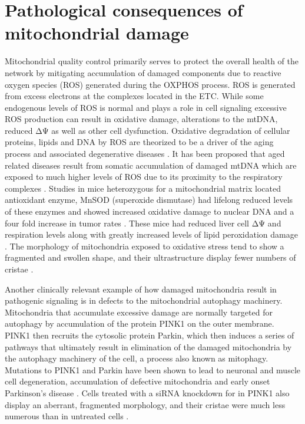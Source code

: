 \section{Pathological consequences of mitochondrial damage}
Mitochondrial quality control primarily serves to protect the overall health of the network by mitigating accumulation of damaged components due to reactive oxygen species (ROS) generated during the OXPHOS process. ROS is generated from excess electrons at the complexes located in the ETC. While some endogenous levels of ROS is normal and plays a role in cell signaling \cite{balaban_mitochondria_2005} excessive ROS production can result in oxidative damage, alterations to the mtDNA, reduced ΔΨ as well as other cell dysfunction. Oxidative degradation of cellular proteins, lipids and DNA by ROS are theorized to be a driver of the aging process \cite{harman_aging:_1956} and associated degenerative diseases \cite{nunnari_mitochondria:_2012}. It has been proposed that aged related diseases result from somatic accumulation of damaged mtDNA which are exposed to much higher levels of ROS due to its proximity to the respiratory complexes \cite{wallace_mitochondrial_2005}. Studies in mice heterozygous for a mitochondrial matrix located antioxidant enzyme, MnSOD (superoxide dismutase) had lifelong reduced levels of these enzymes and showed increased oxidative damage to nuclear DNA and a four fold increase in tumor rates \cite{remmen_life-long_2003}. These mice had reduced liver cell ΔΨ and respiration levels along with greatly increased levels of lipid peroxidation damage \cite{kokoszka_increased_2001}. The morphology of mitochondria exposed to oxidative stress tend to show a fragmented and swollen shape, and their ultrastructure display fewer numbers of cristae \cite{jendrach_short_2008}.

Another clinically relevant example of how damaged mitochondria result in pathogenic signaling is in defects to the mitochondrial autophagy machinery. Mitochondria that accumulate excessive damage are normally targeted for autophagy by accumulation of the protein PINK1 on the outer membrane. PINK1 then recruits the cytosolic protein Parkin, which then induces a series of pathways that ultimately result in elimination of the damaged mitochondria by the autophagy machinery of the cell, a process also known as mitophagy. Mutations to PINK1 and Parkin have been shown to lead to neuronal and muscle cell degeneration, accumulation of defective mitochondria and early onset Parkinson's disease \cite{valente_hereditary_2004,youle_mitochondrial_2012}. Cells treated with a siRNA knockdown for in PINK1 also display an aberrant, fragmented morphology, and their cristae were much less numerous than in untreated cells \cite{exner_loss-function_2007}.
 
